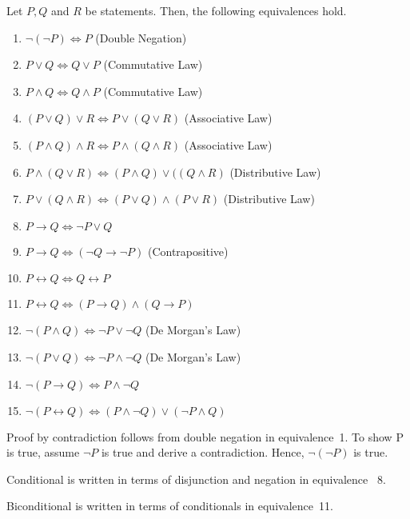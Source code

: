 \documentclass[a4paper,english,12pt]{article}
\begin{document}
\begin{thm}[Equivalences] Let $P,Q$ and $R$ be statements. Then, the following equivalences hold.
	\begin{enumerate}
		\item $\neg ( \neg P) \Leftrightarrow P$ (Double Negation) 
		\item $P \vee Q \Leftrightarrow Q \vee P$ (Commutative Law)
		\item $P \wedge Q \Leftrightarrow Q \wedge P$ (Commutative Law)
		\item $(P \vee Q) \vee R \Leftrightarrow P \vee (Q \vee R)$ (Associative Law)
		\item $(P \wedge Q) \wedge R \Leftrightarrow P \wedge (Q \wedge R)$ (Associative Law)
		\item $P \wedge (Q \vee R) \Leftrightarrow  (P \wedge Q) \vee ((Q \wedge R)$ (Distributive Law)
		\item $P \vee (Q \wedge R) \Leftrightarrow (P \vee Q) \wedge (P \vee R)$ (Distributive Law)
		\item $P \rightarrow Q \Leftrightarrow \neg P \vee Q$
		\item $P \rightarrow Q \Leftrightarrow ( \neg Q \rightarrow \neg P)$ (Contrapositive)
		\item $P \leftrightarrow Q \Leftrightarrow Q \leftrightarrow P$
		\item $P \leftrightarrow Q \Leftrightarrow (P \rightarrow Q) \wedge (Q \rightarrow P)$
		\item $\neg (P \wedge Q) \Leftrightarrow \neg P \vee \neg Q$ (De Morgan's Law)
		\item $\neg (P \vee Q) \Leftrightarrow \neg P \wedge \neg Q$ (De Morgan's Law)
		\item $\neg (P \rightarrow Q) \Leftrightarrow P \wedge \neg Q$
		\item $\neg (P \leftrightarrow Q) \Leftrightarrow (P \wedge \neg Q) \vee ( \neg P \wedge Q)$
	\end{enumerate}
\end{thm}
\begin{rem} Proof by contradiction follows from double negation in equivalence~1. To show P is true, assume  $\neg P$ is true and derive a contradiction. Hence, $\neg ( \neg P)$ is true.  
\end{rem}
\begin{rem} Conditional is written in terms of disjunction and negation in equivalence ~8. 
\end{rem}
\begin{rem} Biconditional is written in terms of conditionals in equivalence~11.
\end{rem}
		
\end{document}
